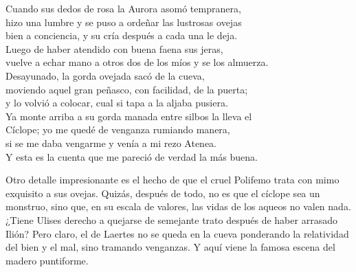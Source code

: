 \begin{versocita}
Cuando sus dedos de rosa la Aurora asomó tempranera,\\
hizo una lumbre y se puso a ordeñar las lustrosas ovejas\\
bien a conciencia, y su cría después a cada una le deja.\\
Luego de haber atendido con buena faena sus jeras,\\
vuelve a echar mano a otros dos de los míos y se los almuerza.\\
Desayunado, la gorda ovejada sacó de la cueva,\\
moviendo aquel gran peñasco, con facilidad, de la puerta;\\
y lo volvió a colocar, cual si tapa a la aljaba pusiera.\\
Ya monte arriba a su gorda manada entre silbos la lleva el\\
Cíclope; yo me quedé de venganza rumiando manera,\\
si se me daba vengarme y venía a mi rezo Atenea.\\
Y esta es la cuenta que me pareció de verdad la más buena.
\end{versocita}

Otro detalle impresionante es el hecho de que el cruel Polifemo trata con mimo exquisito a sus ovejas. Quizás, después de todo, no es que el cíclope sea un monstruo, sino que, en su escala de valores, las vidas de los aqueos no valen nada. ¿Tiene Ulises derecho a quejarse de semejante trato después de haber arrasado Ilión? Pero claro, el de Laertes no se queda en la cueva ponderando la relatividad del bien y el mal, sino tramando venganzas. Y aquí viene la famosa escena del madero puntiforme.

